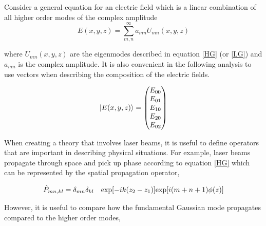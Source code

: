 		Consider a general equation for an electric field which is a linear combination of all higher order modes of the complex amplitude
		\begin{equation}
		E(x,y,z) = \sum\limits_{m,n}^{\infty} a_{mn} U_{mn}(x,y,z)
		\end{equation}
		
		where $ U_{mn}(x,y,z)$ are the eigenmodes described in equation \ref{HG} (or \ref{LG}) and $a_{mn}$ is the complex amplitude.  It is also convenient in the following analysis to use vectors when describing the composition of the electric fields.
		
		\begin{equation}\label{EVector}
		\ket{E(x,y,z)} = \begin{pmatrix} E_{00} 
		\\ E_{01}
		\\E_{10}
		\\E_{20}
		\\E_{02}
		\end{pmatrix}
		\end{equation}

		When creating a theory that involves laser beams, it is useful to define operators that are important in describing physical situations.  For example, laser beams propagate through space and pick up phase according to equation \ref{HG} which can be represented by the spatial propagation operator,
		
		\begin{equation}
		\hat{P}_{mn,kl} = \delta_{mn} \delta_{kl} \quad \text{exp}[-ik(z_2 - z_1)] 
		\\ \text{exp}[i(m+n+1)\phi(z)]
		\end{equation}

		However, it is useful to compare how the fundamental Gaussian mode propagates compared to the higher order modes,

